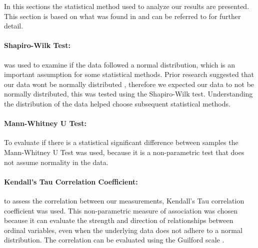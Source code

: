 In this sections the statistical method used to analyze our results are presented. This section is based on what was found in \cite{biksbois} and can be referred to for further detail. %

\paragraph{Shapiro-Wilk Test:} was used to examine if the data followed a normal distribution, which is an important assumption for some statistical methods. Prior research suggested that our data wont be normally distributed \cite{biksbois}, therefore we expected our data to not be normally distributed, this was tested using the Shapiro-Wilk test. Understanding the distribution of the data helped choose subsequent statistical methods.\cite{razali2011power}

\paragraph{Mann-Whitney U Test:}
To evaluate if there is a statistical significant difference between samples the Mann-Whitney U Test was used, because it is a non-parametric test that does not assume normality in the data.\cite{mann1947test}


\paragraph{Kendall's Tau Correlation Coefficient:}
to assess the correlation between our measurements, Kendall's Tau correlation coefficient was used. This non-parametric measure of association was chosen because it can evaluate the strength and direction of relationships between ordinal variables, even when the underlying data does not adhere to a normal distribution.\cite{han1987non} 
The correlation can be evaluated using the Guilford scale
\cite[219]{guilford1950fundamental}.

